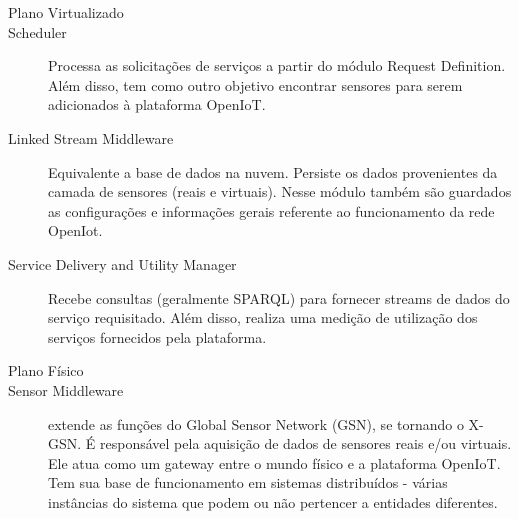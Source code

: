 \begin{description}   
  \item [Plano Virtualizado]   
  \item [Scheduler] Processa as solicitações de serviços a partir do módulo 
  Request Definition. Além disso, tem como outro objetivo encontrar sensores 
  para serem adicionados à plataforma OpenIoT.

  \item [Linked Stream Middleware] Equivalente a base de dados na nuvem. Persiste os
dados provenientes da camada de sensores (reais e virtuais). Nesse módulo também
são guardados as configurações e informações gerais referente ao funcionamento
da rede OpenIot.

  \item [Service Delivery and Utility Manager] Recebe consultas (geralmente SPARQL)
para fornecer streams de dados do serviço requisitado. Além disso, realiza uma
medição de utilização dos serviços fornecidos pela plataforma.
\end{description}

\begin{description}
  \item [Plano Físico]
  \item [Sensor Middleware] extende as funções do Global Sensor Network (GSN), se
tornando o X-GSN. É responsável pela aquisição de dados de sensores reais e/ou
virtuais. Ele atua como um gateway entre o mundo físico e a plataforma OpenIoT.
Tem sua base de funcionamento em sistemas distribuídos - várias instâncias do
sistema que podem ou não pertencer a entidades diferentes.
\end{description}























